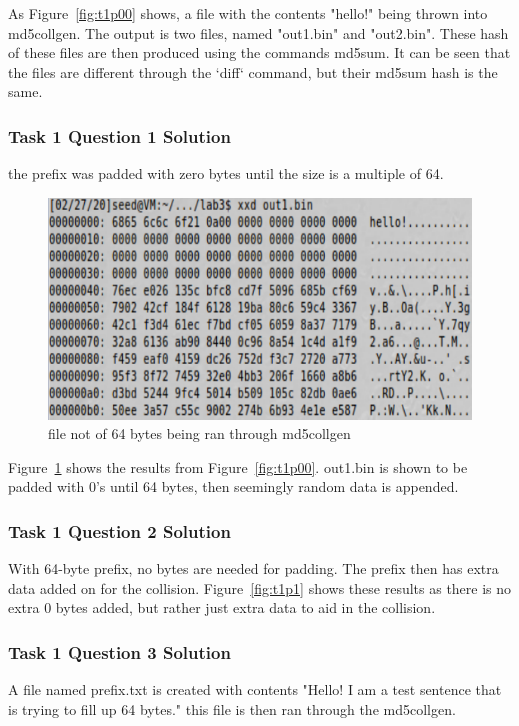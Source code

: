 \documentclass[12pt]{article}
\begin{document}
As Figure~\ref{fig:t1p00} shows, a file with the contents "hello!" being thrown into md5collgen. The output is two files, named "out1.bin" and "out2.bin". These hash of these files are then produced using the commands md5sum. It can be seen that the files are different through the `diff` command, but their md5sum hash is the same.

\subsubsection{Task 1 Question 1 Solution}
the prefix was padded with zero bytes until the size is a multiple of 64.
\begin{figure}[H]
	\begin{center}
		\includegraphics[scale=0.65]{pics/t1p3.png}
	\end{center}{}
	\caption{file not of 64 bytes being ran through md5collgen}
	\label{fig:t1p3}
\end{figure}

Figure~\ref{fig:t1p3} shows the results from Figure~\ref{fig:t1p00}. out1.bin is shown to be padded with 0's until 64 bytes, then seemingly random data is appended.

\subsubsection{Task 1 Question 2 Solution}
With 64-byte prefix, no bytes are needed for padding. The prefix then has extra data added on for the collision. Figure~\ref{fig:t1p1} shows these results as there is no extra 0 bytes added, but rather just extra data to aid in the collision.


\subsubsection{Task 1 Question 3 Solution}
A file named prefix.txt is created with contents "Hello! I am a test sentence that is trying to fill up 64 bytes." this file is then ran through the md5collgen.
\end{document}
